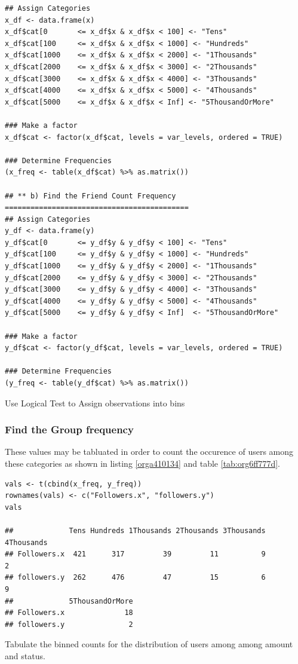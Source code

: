 \documentclass[11pt]{article}
\begin{document}
\begin{listing}[htbp]
\begin{verbatim}
## Assign Categories
x_df <- data.frame(x)
x_df$cat[0       <= x_df$x & x_df$x < 100] <- "Tens"
x_df$cat[100     <= x_df$x & x_df$x < 1000] <- "Hundreds"
x_df$cat[1000    <= x_df$x & x_df$x < 2000] <- "1Thousands"
x_df$cat[2000    <= x_df$x & x_df$x < 3000] <- "2Thousands"
x_df$cat[3000    <= x_df$x & x_df$x < 4000] <- "3Thousands"
x_df$cat[4000    <= x_df$x & x_df$x < 5000] <- "4Thousands"
x_df$cat[5000    <= x_df$x & x_df$x < Inf] <- "5ThousandOrMore"

### Make a factor
x_df$cat <- factor(x_df$cat, levels = var_levels, ordered = TRUE)

### Determine Frequencies
(x_freq <- table(x_df$cat) %>% as.matrix())

## ** b) Find the Friend Count Frequency ===========================================
## Assign Categories
y_df <- data.frame(y)
y_df$cat[0       <= y_df$y & y_df$y < 100] <- "Tens"
y_df$cat[100     <= y_df$y & y_df$y < 1000] <- "Hundreds"
y_df$cat[1000    <= y_df$y & y_df$y < 2000] <- "1Thousands"
y_df$cat[2000    <= y_df$y & y_df$y < 3000] <- "2Thousands"
y_df$cat[3000    <= y_df$y & y_df$y < 4000] <- "3Thousands"
y_df$cat[4000    <= y_df$y & y_df$y < 5000] <- "4Thousands"
y_df$cat[5000    <= y_df$y & y_df$y < Inf]  <- "5ThousandOrMore"

### Make a factor
y_df$cat <- factor(y_df$cat, levels = var_levels, ordered = TRUE)

### Determine Frequencies
(y_freq <- table(y_df$cat) %>% as.matrix())
\end{verbatim}
\caption{\label{org5eea685}Use Logical Test to Assign observations into bins}
\end{listing}

\subsubsection{Find the Group frequency}
\label{sec:org32e7d64}
These values may be tabluated in order to count the occurence of users among these categories as shown in listing \ref{orga410134} and table \ref{tab:org6ff777d}.

\begin{listing}[htbp]
\begin{verbatim}
vals <- t(cbind(x_freq, y_freq))
rownames(vals) <- c("Followers.x", "followers.y")
vals

##             Tens Hundreds 1Thousands 2Thousands 3Thousands 4Thousands
## Followers.x  421      317         39         11          9          2
## followers.y  262      476         47         15          6          9
##             5ThousandOrMore
## Followers.x              18
## followers.y               2
\end{verbatim}
\caption{\label{orga410134}Tabulate the binned counts for the distribution of users among among amount and status.}
\end{listing}
\end{document}

